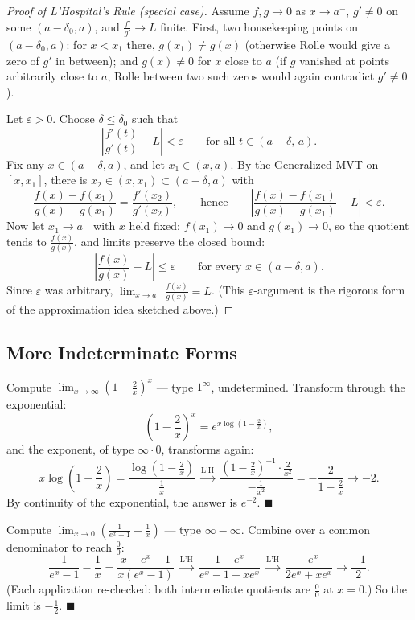 \documentclass[11pt]{report}
\begin{document}
\begin{proof}[Proof of L'Hospital's Rule (special case)]
Assume $f, g \to 0$ as $x \to a^-$, $g' \neq 0$ on some $(a - \delta_0, a)$, and $\tfrac{f'}{g'} \to L$ finite. First, two housekeeping points on $(a-\delta_0, a)$: for $x < x_1$ there, $g(x_1) \neq g(x)$ (otherwise Rolle would give a zero of $g'$ in between); and $g(x) \neq 0$ for $x$ close to $a$ (if $g$ vanished at points arbitrarily close to $a$, Rolle between two such zeros would again contradict $g' \neq 0$).

Let $\varepsilon > 0$. Choose $\delta \leq \delta_0$ such that
\[
\left| \frac{f'(t)}{g'(t)} - L \right| < \varepsilon \qquad \text{for all } t \in (a - \delta,\, a).
\]
Fix any $x \in (a-\delta, a)$, and let $x_1 \in (x, a)$. By the Generalized MVT on $[x, x_1]$, there is $x_2 \in (x, x_1) \subset (a-\delta, a)$ with
\[
\frac{f(x) - f(x_1)}{g(x) - g(x_1)} = \frac{f'(x_2)}{g'(x_2)}, \qquad \text{hence} \qquad \left| \frac{f(x) - f(x_1)}{g(x) - g(x_1)} - L \right| < \varepsilon.
\]
Now let $x_1 \to a^-$ with $x$ held fixed: $f(x_1) \to 0$ and $g(x_1) \to 0$, so the quotient tends to $\tfrac{f(x)}{g(x)}$, and limits preserve the closed bound:
\[
\left| \frac{f(x)}{g(x)} - L \right| \leq \varepsilon \qquad \text{for every } x \in (a - \delta, a).
\]
Since $\varepsilon$ was arbitrary, $\lim_{x\to a^-} \tfrac{f(x)}{g(x)} = L$. (This $\varepsilon$-argument is the rigorous form of the approximation idea sketched above.)
\end{proof}

\subsection{More Indeterminate Forms}

\begin{exbox}
Compute $\displaystyle\lim_{x\to\infty} \left( 1 - \frac2x \right)^x$ --- type $1^\infty$, undetermined. Transform through the exponential:
\[
\left(1 - \frac2x\right)^x = e^{x \log\left(1 - \frac2x\right)},
\]
and the exponent, of type $\infty \cdot 0$, transforms again:
\[
x \log\left(1 - \frac2x\right) = \frac{\log\left(1 - \frac2x\right)}{\frac1x}
\ \xrightarrow{\text{L'H}}\
\frac{\left(1 - \frac2x\right)^{-1} \cdot \frac{2}{x^2}}{-\frac{1}{x^2}} = -\frac{2}{1 - \frac2x} \longrightarrow -2.
\]
By continuity of the exponential, the answer is $e^{-2}$. \hfill $\blacksquare$
\end{exbox}

\begin{exbox}
Compute $\displaystyle\lim_{x\to0} \left( \frac{1}{e^x - 1} - \frac{1}{x} \right)$ --- type $\infty - \infty$. Combine over a common denominator to reach $\tfrac00$:
\[
\frac{1}{e^x-1} - \frac1x = \frac{x - e^x + 1}{x(e^x - 1)}
\ \xrightarrow{\text{L'H}}\
\frac{1 - e^x}{e^x - 1 + x e^x}
\ \xrightarrow{\text{L'H}}\
\frac{-e^x}{2e^x + x e^x} \longrightarrow \frac{-1}{2}.
\]
(Each application re-checked: both intermediate quotients are $\tfrac00$ at $x = 0$.) So the limit is $-\tfrac12$. \hfill $\blacksquare$
\end{exbox}
\end{document}
